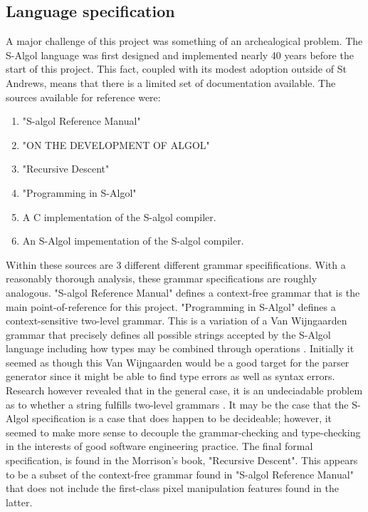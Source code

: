 \documentclass{article}
\begin{document}
\subsection{Language specification}

A major challenge of this project was something of an archealogical problem. The S-Algol language was first designed and implemented nearly 40 years before the start of this project. This fact, coupled with its modest adoption outside of St Andrews, means that there is a limited set of documentation available. The sources available for reference were:

\begin{enumerate}
\item "S-algol Reference Manual" \cite{TODO}
\item "ON THE DEVELOPMENT OF ALGOL" \cite{TODO}
\item "Recursive Descent" \cite{TODO}
\item "Programming in S-Algol" \cite{TODO}
\item A C implementation of the S-algol compiler. 
\item An S-Algol impementation of the S-algol compiler. 
\end{enumerate}

Within these sources are 3 different different grammar specififications. With a reasonably thorough analysis, these grammar specifications are roughly analogous. "S-algol Reference Manual" defines a context-free grammar that is the main point-of-reference for this project. "Programming in S-Algol" defines a context-sensitive two-level grammar. This is a variation of a Van Wijngaarden grammar that precisely defines all possible strings accepted by the S-Algol language including how types may be combined through operations \cite{TODO}. Initially it seemed as though this Van Wijngaarden would be a good target for the parser generator since it might be able to find type errors as well as syntax errors. Research however revealed that in the general case, it is an undeciadable problem as to whether a string fulfills two-level grammars \cite{TODO}. It may be the case that the S-Algol specification is a case that does happen to be decideable; however, it seemed to make more sense to decouple the grammar-checking and type-checking in the interests of good software engineering practice. The final formal specification, is found in the Morrison's book, "Recursive Descent". This appears to be a subset of the context-free grammar found in "S-algol Reference Manual" that does not include the first-class pixel manipulation features found in the latter.
\end{document}
